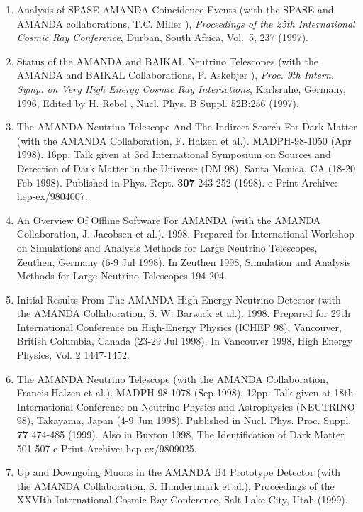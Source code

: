 \begin{enumerate}
\item Analysis of SPASE-AMANDA Coincidence Events (with the SPASE and
  AMANDA collaborations, T.C. Miller \etal), {\it Proceedings of the
    25th International Cosmic Ray Conference}, Durban, South Africa,
  Vol.~5, 237 (1997).

\item Status of the AMANDA and BAIKAL Neutrino Telescopes (with the
  AMANDA and BAIKAL Collaborations, P. Askebjer \etal), {\it Proc. 9th
    Intern. Symp. on Very High Energy Cosmic Ray Interactions},
  Karlsruhe, Germany, 1996, Edited by H. Rebel \etal, Nucl. Phys. B
  Suppl. 52B:256 (1997).

\item The AMANDA Neutrino Telescope And The Indirect Search For Dark
  Matter (with the AMANDA Collaboration, F. Halzen et
  al.). MADPH-98-1050 (Apr 1998). 16pp.  Talk given at 3rd
  International Symposium on Sources and Detection of Dark Matter in
  the Universe (DM 98), Santa Monica, CA (18-20 Feb 1998).  Published
  in Phys. Rept. {\bf 307} 243-252 (1998).  e-Print Archive:
  hep-ex/9804007.

\item An Overview Of Offline Software For AMANDA (with the AMANDA
  Collaboration, J. Jacobsen et al.). 1998.  Prepared for
  International Workshop on Simulations and Analysis Methods for Large
  Neutrino Telescopes, Zeuthen, Germany (6-9 Jul 1998). In Zeuthen
  1998, Simulation and Analysis Methods for Large Neutrino Telescopes
  194-204.

\item Initial Results From The AMANDA High-Energy Neutrino Detector
  (with the AMANDA Collaboration, S. W. Barwick et al.). 1998.
  Prepared for 29th International Conference on High-Energy Physics
  (ICHEP 98), Vancouver, British Columbia, Canada (23-29 Jul 1998). In
  Vancouver 1998, High Energy Physics, Vol. 2 1447-1452.

\item The AMANDA Neutrino Telescope (with the AMANDA Collaboration,
  Francis Halzen et al.). MADPH-98-1078 (Sep 1998). 12pp.  Talk given
  at 18th International Conference on Neutrino Physics and
  Astrophysics (NEUTRINO 98), Takayama, Japan (4-9 Jun 1998).
  Published in Nucl. Phys. Proc. Suppl. {\bf 77} 474-485 (1999). Also
  in Buxton 1998, The Identification of Dark Matter 501-507 e-Print
  Archive: hep-ex/9809025.

\item Up and Downgoing Muons in the AMANDA B4 Prototype Detector (with
  the AMANDA Collaboration, S. Hundertmark et al.), Proceedings of the
  XXVIth International Cosmic Ray Conference, Salt Lake City, Utah
  (1999).


\end{enumerate}
